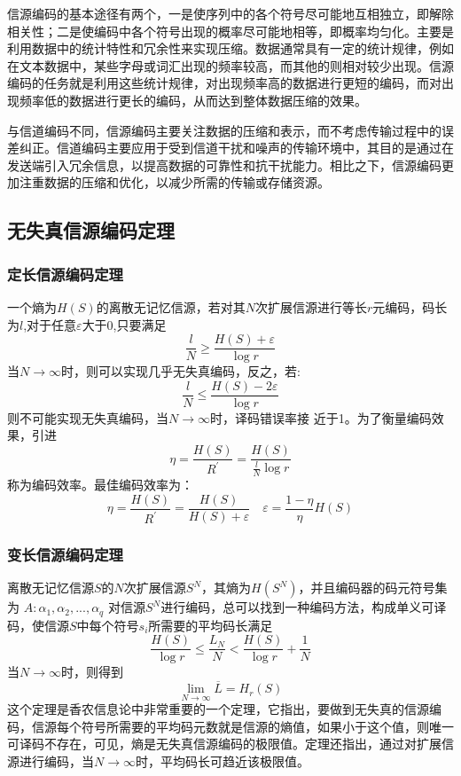 \begin{multicols}{2}
信源编码的基本途径有两个，一是使序列中的各个符号尽可能地互相独立，即解除相关性；二是使编码中各个符号出现的概率尽可能地相等，即概率均匀化。主要是利用数据中的统计特性和冗余性来实现压缩。数据通常具有一定的统计规律，例如在文本数据中，某些字母或词汇出现的频率较高，而其他的则相对较少出现。信源编码的任务就是利用这些统计规律，对出现频率高的数据进行更短的编码，而对出现频率低的数据进行更长的编码，从而达到整体数据压缩的效果。

与信道编码不同，信源编码主要关注数据的压缩和表示，而不考虑传输过程中的误差纠正。信道编码主要应用于受到信道干扰和噪声的传输环境中，其目的是通过在发送端引入冗余信息，以提高数据的可靠性和抗干扰能力。相比之下，信源编码更加注重数据的压缩和优化，以减少所需的传输或存储资源。
\subsection{无失真信源编码定理}
\subsubsection{定长信源编码定理}
一个熵为$H(S)$的离散无记忆信源，若对其$N$次扩展信源进行等长$r$元编码，码长为$l$,对于任意$\varepsilon$大于0,只要满足
\begin{equation}
	\frac{l}{N} \geq \frac{H(S)+\varepsilon}{\log r}
\end{equation}
当$N\rightarrow \infty$时，则可以实现几乎无失真编码，反之，若:
\begin{equation}
	\frac{l}{N} \leq \frac{H(S)-2 \varepsilon}{\log r}
\end{equation}
则不可能实现无失真编码，当$N\rightarrow \infty$时，译码错误率接
近于1。为了衡量编码效果，引进
\begin{equation}
	\eta=\frac{H(S)}{R^{\prime}}=\frac{H(S)}{\frac{l}{N} \log r}
\end{equation}
称为编码效率。最佳编码效率为：
\begin{equation}
	\eta=\frac{H(S)}{R^{\prime}}=\frac{H(S)}{H(S)+\varepsilon} \quad \varepsilon=\frac{1-\eta}{\eta} H(S)
\end{equation}

\subsubsection{变长信源编码定理}
离散无记忆信源$S$的$N$次扩展信源$S^N$，其熵为$H(S^N)$，并且编码器的码元符号集为 $A:{\alpha_1,\alpha_2,...,\alpha_q}$ 对信源$S^N$进行编码，总可以找到一种编码方法，构成单义可译码，使信源$S$中每个符号$s_i$所需要的平均码长满足
\begin{equation}
	\frac{H(S)}{\log r} \leq \frac{L_{N}}{N}<\frac{H(S)}{\log r}+\frac{1}{N}
\end{equation}
当$N\rightarrow \infty$时，则得到
\begin{equation}
	\lim_{N\rightarrow \infty} \overline{L} = H_r(S)
\end{equation}
这个定理是香农信息论中非常重要的一个定理，它指出，要做到无失真的信源编码，信源每个符号所需要的平均码元数就是信源的熵值，如果小于这个值，则唯一可译码不存在，可见，熵是无失真信源编码的极限值。定理还指出，通过对扩展信源进行编码，当$N\rightarrow \infty$时，平均码长可趋近该极限值。


\end{multicols}
